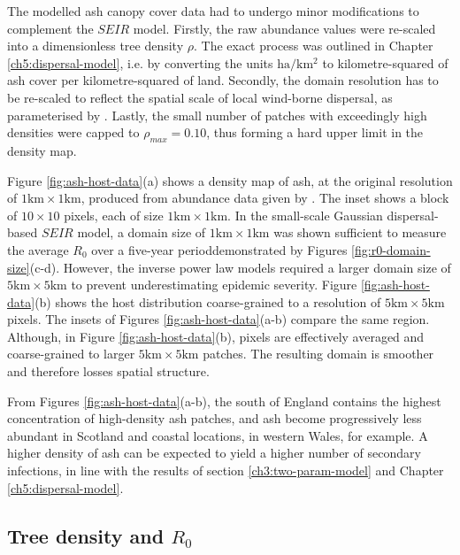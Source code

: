 The modelled ash canopy cover data had to undergo minor modifications to complement the $SEIR$ model. 
Firstly, the raw abundance values were re-scaled into a dimensionless tree density $\rho$. 
The exact process was outlined in Chapter \ref{ch5:dispersal-model}, i.e. by converting the units $\mathrm{ha/km^2}$ to kilometre-squared
of ash cover per kilometre-squared of land. Secondly, the domain resolution has to be re-scaled to reflect the spatial scale of local 
wind-borne dispersal, as parameterised by \cite{grosdidier2018tracking}. 
Lastly, the small number of patches with exceedingly high densities were capped to $\rho_{max} = 0.10$, thus forming a hard upper limit in the density map.

Figure \ref{fig:ash-host-data}(a) shows a density map of ash, at the original resolution of
$\mathrm{1km}\times \mathrm{1km}$, produced from abundance data given by \cite{hill.data}.
The inset shows a block of $10\times10$ pixels, each of size $1\mathrm{km} \times 1 \mathrm{km}$.
In the small-scale Gaussian dispersal-based $SEIR$ model, a domain size of $\mathrm{1km}\times \mathrm{1km}$ was shown sufficient
to measure the average $R_0$ over a five-year period\textemdash demonstrated by Figures \ref{fig:r0-domain-size}(c-d).
However, the inverse power law models required a larger domain size of $\mathrm{5km}\times \mathrm{5km}$ to prevent underestimating epidemic severity.
Figure \ref{fig:ash-host-data}(b) shows the host distribution coarse-grained to a resolution of $\mathrm{5km}\times \mathrm{5km}$ pixels.
The insets of Figures \ref{fig:ash-host-data}(a-b) compare the same region.
Although, in Figure \ref{fig:ash-host-data}(b), pixels are effectively averaged and coarse-grained to larger $5\mathrm{km} \times 5 \mathrm{km}$ patches.
The resulting domain is smoother and therefore losses spatial structure.

From Figures \ref{fig:ash-host-data}(a-b), the south of England contains the highest concentration of high-density ash patches, 
and ash become progressively less abundant in Scotland and coastal locations, in western Wales, for example. 
A higher density of ash can be expected to yield a higher number of secondary infections, 
in line with the results of section \ref{ch3:two-param-model} and Chapter \ref{ch5:dispersal-model}.

\subsection{Tree density and $R_0$}
\label{section:r0-tree-density}


